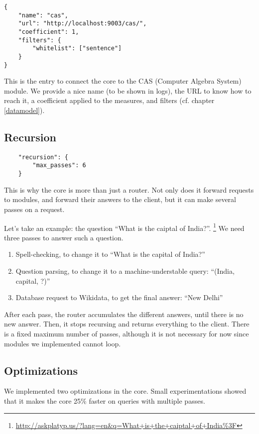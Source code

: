 \begin{verbatim}
{
    "name": "cas",
    "url": "http://localhost:9003/cas/",
    "coefficient": 1,
    "filters": {
        "whitelist": ["sentence"]
    }
}
\end{verbatim}

This is the entry to connect the core to the CAS (Computer Algebra System)
module. We provide a nice name (to be
shown in logs), the URL to know how to reach it, a coefficient applied to
the measures, and filters (cf. chapter \ref{datamodel}).

\subsection{Recursion}

\begin{verbatim}
    "recursion": {
        "max_passes": 6
    }
\end{verbatim}

This is why the core is more than just a router. Not only does it forward
requests to modules, and forward their answers to the client, but it can
make several passes on a request.

Let's take an example: the question “What is the caiptal of India?”.
\footnote{\url{http://askplatyp.us/?lang=en&q=What+is+the+caiptal+of+India\%3F}}
We need three passes to answer such a question.

\begin{enumerate}
    \item Spell-checking, to change it to “What is the capital of India?”
    \item Question parsing, to change it to a machine-understable query:
        “(India, capital, ?)”
    \item Database request to Wikidata, to get the final answer:
        “New Delhi”
\end{enumerate}

After each pass, the router accumulates the different answers, until
there is no new answer. Then, it stops recursing and returns everything
to the client.
There is a fixed maximum number of passes, although it is not necessary
for now since modules we implemented cannot loop.

\subsection{Optimizations}

We implemented two optimizations in the core. Small experimentations showed that
it makes the core 25\% faster on queries with multiple passes.

